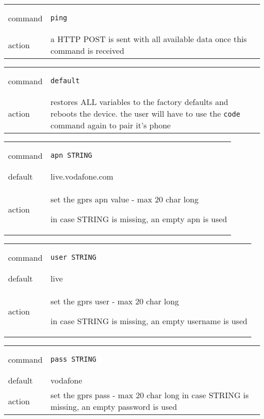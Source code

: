 \documentclass[a4paper,twoside]{refart}
\begin{document}
\begin{tabular}{ |l|p{8cm}| }
    \hline
        command & 
\begin{lstlisting}
ping
\end{lstlisting} \\
        action & 
a HTTP POST is sent with all available data once this command is received \\ \hline
\end{tabular}

\begin{tabular}{ |l|p{8cm}| }
    \hline
        command & 
\begin{lstlisting}
default
\end{lstlisting} \\
        action & 
restores ALL variables to the factory defaults and reboots the device. the user will have to use the \verb"code" command again to pair it's phone\\ \hline
\end{tabular}


\begin{tabular}{ |l|p{8cm}| }
    \hline
        command & 
\begin{lstlisting}
apn STRING
\end{lstlisting} \\
        default & live.vodafone.com \\
        action & 
set the gprs apn value - max 20 char long

in case STRING is missing, an empty apn is used \\ \hline
\end{tabular}


\begin{tabular}{ |l|p{8cm}| }
    \hline
        command & 
\begin{lstlisting}
user STRING
\end{lstlisting} \\
        default & live \\
        action & 
set the gprs user  - max 20 char long

in case STRING is missing, an empty username is used  \\ \hline
\end{tabular}


\begin{tabular}{ |l|p{8cm}| }
    \hline
        command & 
\begin{lstlisting}
pass STRING
\end{lstlisting} \\
        default & vodafone \\
        action & 
set the gprs pass - max 20 char long
in case STRING is missing, an empty password is used  \\ \hline
\end{tabular}
\end{document}
